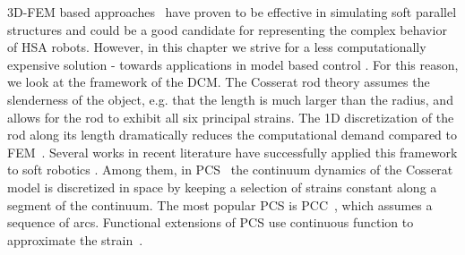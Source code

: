 3D-\gls{FEM} based approaches~\cite{farrell2020extension} have proven to be effective in simulating soft parallel structures \cite{vanneste2021enabling} and could be a good candidate for representing the complex behavior of \gls{HSA} robots. However, in this chapter we strive for a less computationally expensive solution - towards applications in model based control \cite{della2023model}. For this reason, we look at the framework of the \gls{DCM}. The Cosserat rod theory assumes the slenderness of the object, e.g. that the length is much larger than the radius, and allows for the rod to exhibit all six principal strains. The 1D discretization of the rod along its length dramatically reduces the computational demand compared to \gls{FEM}~\cite{gazzola2018forward}. 
%
Several works in recent literature have successfully applied this framework to soft robotics \cite{grazioso2019geometrically,sadati2021tmtdyn,armanini2023soft}. Among them, in \gls{PCS}~\cite{renda2018discrete} the continuum dynamics of the Cosserat model is discretized in space by keeping a selection of strains constant along a segment of the continuum. %
The most popular \gls{PCS} is \gls{PCC}~\cite{webster2010design}, which assumes a sequence of arcs. Functional extensions of \gls{PCS} use continuous function to approximate the strain~\cite{della2019control,renda2020geometric}. %

